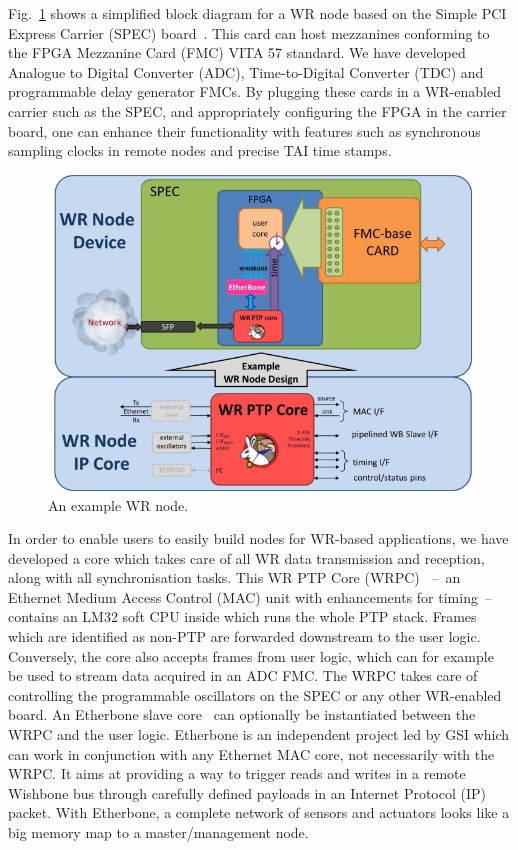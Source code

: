 \documentclass{../JAC2003}
\begin{document}
Fig.~\ref{node-fig} shows a simplified block diagram for a WR node
based on the Simple PCI Express Carrier (SPEC)
board~\cite{spec-ref}. This card can host mezzanines conforming to the
FPGA Mezzanine Card (FMC) VITA 57 standard. We have developed Analogue
to Digital Converter (ADC), Time-to-Digital Converter (TDC) and
programmable delay generator FMCs. By plugging these cards in a
WR-enabled carrier such as the SPEC, and appropriately configuring the
FPGA in the carrier board, one can enhance their functionality with
features such as synchronous sampling clocks in remote nodes and
precise TAI time stamps.

\begin{figure}[htb]
   \centering
   \includegraphics*[width=\columnwidth]{node/wrNode.jpg}
   \caption{An example WR node.}
   \label{node-fig}
\end{figure}

In order to enable users to easily build nodes for WR-based
applications, we have developed a core which takes care of all WR data
transmission and reception, along with all synchronisation tasks. This
WR PTP Core (WRPC)~\cite{wrpc-ref} --~an Ethernet Medium Access
Control (MAC) unit with enhancements for timing~-- contains an LM32
soft CPU inside which runs the whole PTP stack. Frames which are
identified as non-PTP are forwarded downstream to the user
logic. Conversely, the core also accepts frames from user logic, which
can for example be used to stream data acquired in an ADC FMC. The
WRPC takes care of controlling the programmable oscillators on the
SPEC or any other WR-enabled board. An Etherbone slave
core~\cite{etherbone-ref} can optionally be instantiated between the
WRPC and the user logic. Etherbone is an independent project led by
GSI which can work in conjunction with any Ethernet MAC core, not
necessarily with the WRPC. It aims at providing a way to trigger reads
and writes in a remote Wishbone bus through carefully defined payloads
in an Internet Protocol (IP) packet. With Etherbone, a complete
network of sensors and actuators looks like a big memory map to a
master/management node.
\end{document}
